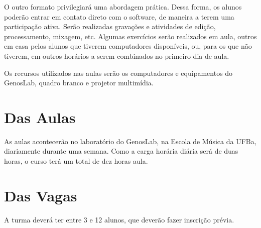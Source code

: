 \documentclass{article}
\begin{document}
O outro formato privilegiará uma abordagem prática. Dessa forma, os
alunos poderão entrar em contato direto com o software, de maneira a
terem uma participação ativa. Serão realizadas gravações e atividades
de edição, processamento, mixagem, etc. Algumas exercícios serão
realizados em aula, outros em casa pelos alunos que tiverem
computadores disponíveis, ou, para os que não tiverem, em outros
horários a serem combinados no primeiro dia de aula.

Os recursos utilizados nas aulas serão os computadores e equipamentos
do GenosLab, quadro branco e projetor multimídia.


\section{Das Aulas}

As aulas acontecerão no laboratório do GenosLab, na Escola de Música
da UFBa, diariamente durante uma semana. Como a carga horária diária
será de duas horas, o curso terá um total de dez horas aula.

\section{Das Vagas}

A turma deverá ter entre 3 e 12 alunos, que deverão fazer inscrição
prévia.

\nocite{roads96:_comput_music_tutor,gibson02:_artis_pro_series,iazzetad.:_tutor_de_e,boulanger00:_csoun_book,dodge97:_comput_music,menezes03:_music_em_palav_e_sons,menezes96,menezes06:_maxim,moore90:_elemen_of_comput_music,schaeffer93:_tratad_dos_objet_music,d.:_manual_ardour}


% 

\end{document}
